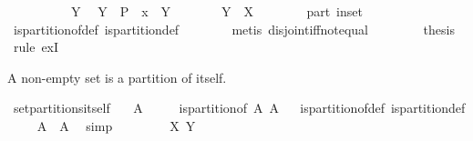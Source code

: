 \begin{isabellebody}
\ \ \isamarkupfalse%
\ \isacommand{{\isacharbraceleft}}\isamarkupfalse%
\isanewline
\ \ \ \ \isamarkupfalse%
\ Y\ \isamarkupfalse%
\ {\isachardoublequoteopen}Y\ {\isasymin}\ P\ {\isasymand}\ x\ {\isasymin}\ Y{\isachardoublequoteclose}\isanewline
\ \ \ \ \isamarkupfalse%
\ \isamarkupfalse%
\ {\isachardoublequoteopen}Y\ {\isacharequal}\ X{\isachardoublequoteclose}\isanewline
\ \ \ \ \ \ \isamarkupfalse%
\ part\ in{\isacharunderscore}set\ {\isacharasterisk}\isanewline
\ \ \ \ \ \ \isamarkupfalse%
\ is{\isacharunderscore}partition{\isacharunderscore}of{\isacharunderscore}def\ is{\isacharunderscore}partition{\isacharunderscore}def\isanewline
\ \ \ \ \ \ \isamarkupfalse%
\ {\isacharparenleft}metis\ disjoint{\isacharunderscore}iff{\isacharunderscore}not{\isacharunderscore}equal{\isacharparenright}\isanewline
\ \ \isacommand{{\isacharbraceright}}\isamarkupfalse%
\isanewline
\ \ \isamarkupfalse%
\ \isamarkupfalse%
\ {\isacharquery}thesis\ \isamarkupfalse%
\ {\isacharparenleft}rule\ ex{}I{\isacharparenright}\isanewline
{}\isamarkupfalse%
%
\endisatagproof
{\isafoldproof}%
%
\isadelimproof
%
\endisadelimproof
%
\begin{isamarkuptext}%
A non-empty set is a partition of itself.%
\end{isamarkuptext}%
\isamarkuptrue%
\isamarkupfalse%
\ set{\isacharunderscore}partitions{\isacharunderscore}itself{\isacharcolon}\isanewline
\ \ \ {\isachardoublequoteopen}A\ {\isasymnoteq}\ {\isacharbraceleft}{\isacharbraceright}{\isachardoublequoteclose}\isanewline
\ \ \ {\isachardoublequoteopen}is{\isacharunderscore}partition{\isacharunderscore}of\ {\isacharbraceleft}A{\isacharbraceright}\ A{\isachardoublequoteclose}%
\isadelimproof
\ %
\endisadelimproof
%
\isatagproof
{}\isamarkupfalse%
\ is{\isacharunderscore}partition{\isacharunderscore}of{\isacharunderscore}def\ is{\isacharunderscore}partition{\isacharunderscore}def\isanewline
\isanewline
{}\isamarkupfalse%
\isanewline
\ \ \isamarkupfalse%
\ {\isachardoublequoteopen}{\isasymUnion}\ {\isacharbraceleft}A{\isacharbraceright}\ {\isacharequal}\ A{\isachardoublequoteclose}\ \isamarkupfalse%
\ simp\isanewline
\ \ \isacommand{{\isacharbraceleft}}\isamarkupfalse%
\isanewline
\ \ \ \ \isamarkupfalse%
\ X\ Y\isanewline

\end{isabellebody}
